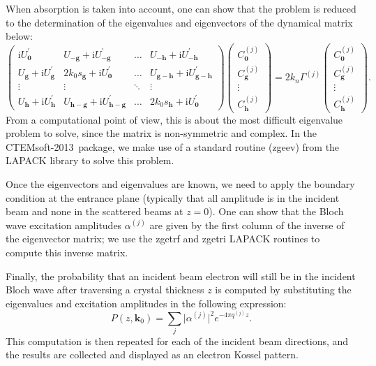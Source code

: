 \documentclass[DIV=calc, paper=letter, fontsize=11pt]{scrartcl}	 %
\newcommand{\ctp}{\textsf{CTEMsoft-2013}}
\newcommand{\upg}[1]{\mathrm{i}U_{\mathbf{#1}}^{\prime}}
\newcommand{\combo}[1]{U_{\mathbf{#1}}+\upg{#1}}
\newcommand{\upgcombo}[2]{2k_{0}s_{\mathbf{#1}}+\upg{#2}}
\newcommand{\Cgj}[2]{C_{\mathbf{#1}}^{(#2)}}
\begin{document}
When absorption is taken into account, one can show that the problem is reduced
to the determination of the eigenvalues and eigenvectors of the dynamical matrix below:
\begin{equation}
	\left(\begin{matrix}
	\upg{0} & \combo{-g} & \ldots & \combo{-h}\\
	\combo{g} & \upgcombo{g}{0} & \ldots & \combo{g-h}\\
	\vdots  &  \vdots &  \ddots  &  \vdots\\
	\combo{h} & \combo{h-g} & \ldots & \upgcombo{h}{0}
	\end{matrix}\right)
	\left(\begin{matrix}
	\Cgj{0}{j}\\ \Cgj{g}{j}\\ \vdots\\ \Cgj{h}{j}
	\end{matrix}\right)=2k_{n}\Gamma^{(j)}\left(\begin{matrix}
	\Cgj{0}{j}\\ \Cgj{g}{j}\\ \vdots\\ \Cgj{h}{j}
	\end{matrix}\right).\label{eq:blochmatrixabs}
\end{equation}
From a computational point of view, this is about the most difficult eigenvalue problem to solve, since 
the matrix is non-symmetric and complex.  In the \ctp\ package, we make use of a standard routine (\textsf{zgeev}) from the LAPACK
library to solve this problem.

Once the eigenvectors and eigenvalues are known, we need to apply the boundary condition at the 
entrance plane (typically that all amplitude is in the incident beam and none in the scattered beams at $z=0$).
One can show that the Bloch wave excitation amplitudes $\alpha^{(j)}$ are given by the first column of the 
inverse of the eigenvector matrix; we use the \textsf{zgetrf} and \textsf{zgetri} LAPACK routines to compute 
this inverse matrix.

Finally, the probability that an incident beam electron will still be in the incident Bloch
wave after traversing a crystal thickness $z$ is computed by substituting the eigenvalues and excitation
amplitudes in the following expression:
\begin{equation}
	P(z,\mathbf{k}_0) = \sum_j \vert \alpha^{(j)}\vert^2 e^{-4\pi q^{(j)}z}.\label{eq:EKP}
\end{equation}
This computation is then repeated for each of the incident beam directions, and the results are collected and displayed as an 
electron Kossel pattern.
\end{document}
